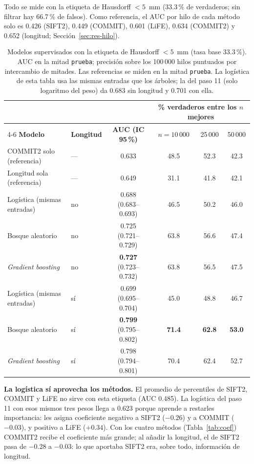 \documentclass[11pt,a4paper]{article}
\newcommand{\code}[1]{\texttt{\small #1}}
\begin{document}
Todo se mide con la etiqueta de Hausdorff $<5$~mm (33.3\,\% de verdaderos; sin filtrar hay
66.7\,\% de falsos). Como referencia, el AUC por hilo de cada m\'etodo solo es 0.426 (SIFT2),
0.449 (COMMIT), 0.601 (LiFE), 0.634 (COMMIT2) y 0.652 (longitud;
Secci\'on~\ref{sec:res-hilo}).

\begin{table}[H]
\centering
\small
\begin{tabular}{@{}llcccc@{}}
\toprule
 & & & \multicolumn{3}{c}{\textbf{\% verdaderos entre los $n$ mejores}}\\
\cmidrule(l){4-6}
\textbf{Modelo} & \textbf{Longitud} & \textbf{AUC (IC 95\,\%)} & $n=10\,000$ & 25\,000 & 50\,000\\
\midrule
COMMIT2 solo (referencia)   & --- & 0.633                 & 48.5 & 52.3 & 42.3\\
Longitud sola (referencia)  & --- & 0.649                 & 31.1 & 41.8 & 42.1\\
\addlinespace
Log\'istica (mismas entradas) & no  & 0.688 (0.683--0.693)  & 46.5 & 50.2 & 46.0\\
Bosque aleatorio            & no  & 0.725 (0.721--0.729)  & 63.8 & 56.6 & 47.4\\
\textit{Gradient boosting}  & no  & \textbf{0.727} (0.723--0.732) & 63.8 & 56.5 & 47.5\\
\addlinespace
Log\'istica (mismas entradas) & s\'i & 0.699 (0.695--0.704) & 45.0 & 48.8 & 46.7\\
Bosque aleatorio            & s\'i & \textbf{0.799} (0.795--0.802) & \textbf{71.4} & \textbf{62.8} & \textbf{53.0}\\
\textit{Gradient boosting}  & s\'i & 0.798 (0.794--0.801) & 70.4 & 62.4 & 52.7\\
\bottomrule
\end{tabular}
\caption{Modelos supervisados con la etiqueta de Hausdorff $<5$~mm (tasa base 33.3\,\%). AUC
en la mitad \code{prueba}; precisi\'on sobre los 100\,000 hilos puntuados por intercambio de
mitades. Las referencias se miden en la mitad \code{prueba}. La log\'istica de esta tabla
usa las mismas entradas que los \'arboles; la del paso 11 (solo logaritmo del peso) da 0.683
sin longitud y 0.701 con ella.}
\label{tab:modelos}
\end{table}

\textbf{La log\'istica s\'i aprovecha los m\'etodos.} El promedio de percentiles de SIFT2,
COMMIT y LiFE no sirve con esta etiqueta (AUC 0.485). La log\'istica del paso 11 con esos
mismos tres pesos llega a 0.623 porque aprende a restarles importancia: les asigna
coeficiente negativo a SIFT2 ($-0.26$) y a COMMIT ($-0.03$), y positivo a LiFE ($+0.34$).
Con los cuatro m\'etodos (Tabla~\ref{tab:coef}) COMMIT2 recibe el coeficiente m\'as grande;
al a\~nadir la longitud, el de SIFT2 pasa de $-0.28$ a $-0.03$: lo que aportaba SIFT2 era,
sobre todo, informaci\'on de longitud.
\end{document}
